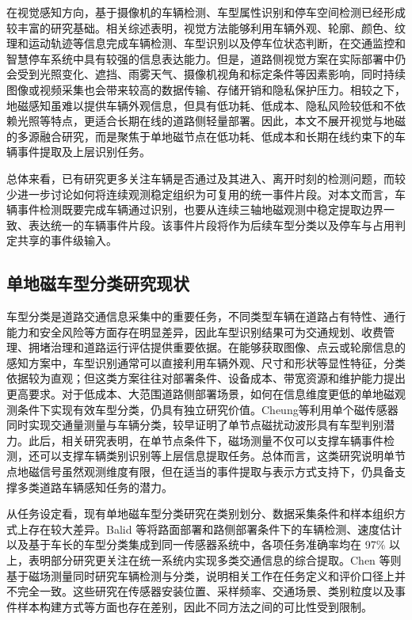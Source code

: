 \documentclass{xdupgthesis}
\begin{document}
在视觉感知方向，基于摄像机的车辆检测、车型属性识别和停车空间检测已经形成较丰富的研究基础。相关综述表明，视觉方法能够利用车辆外观、轮廓、颜色、纹理和运动轨迹等信息完成车辆检测、车型识别以及停车位状态判断，在交通监控和智慧停车系统中具有较强的信息表达能力\cite{ch1_yang2018visionvehicle,ch1_ni2021vehicleattribute,ch1_ma2022visionparking}。但是，道路侧视觉方案在实际部署中仍会受到光照变化、遮挡、雨雾天气、摄像机视角和标定条件等因素影响，同时持续图像或视频采集也会带来较高的数据传输、存储开销和隐私保护压力。相较之下，地磁感知虽难以提供车辆外观信息，但具有低功耗、低成本、隐私风险较低和不依赖光照等特点，更适合长期在线的道路侧轻量部署。因此，本文不展开视觉与地磁的多源融合研究，而是聚焦于单地磁节点在低功耗、低成本和长期在线约束下的车辆事件提取及上层识别任务。

总体来看，已有研究更多关注车辆是否通过及其进入、离开时刻的检测问题，而较少进一步讨论如何将连续观测稳定组织为可复用的统一事件片段。对本文而言，车辆事件检测既要完成车辆通过识别，也要从连续三轴地磁观测中稳定提取边界一致、表达统一的车辆事件片段。该事件片段将作为后续车型分类以及停车与占用判定共享的事件级输入。

\subsection{单地磁车型分类研究现状}
\label{sec:related_vehicle_classification}

车型分类是道路交通信息采集中的重要任务，不同类型车辆在道路占有特性、通行能力和安全风险等方面存在明显差异，因此车型识别结果可为交通规划、收费管理、拥堵治理和道路运行评估提供重要依据。在能够获取图像、点云或轮廓信息的感知方案中，车型识别通常可以直接利用车辆外观、尺寸和形状等显性特征，分类依据较为直观；但这类方案往往对部署条件、设备成本、带宽资源和维护能力提出更高要求。对于低成本、大范围道路侧部署场景，如何在信息维度更低的单地磁观测条件下实现有效车型分类，仍具有独立研究价值。Cheung等\cite{R17}利用单个磁传感器同时实现交通量测量与车辆分类，较早证明了单节点磁扰动波形具有车型判别潜力。此后，相关研究表明，在单节点条件下，磁场测量不仅可以支撑车辆事件检测，还可以支撑车辆类别识别等上层信息提取任务\cite{R19}。总体而言，这类研究说明单节点地磁信号虽然观测维度有限，但在适当的事件提取与表示方式支持下，仍具备支撑多类道路车辆感知任务的潜力。

从任务设定看，现有单地磁车型分类研究在类别划分、数据采集条件和样本组织方式上存在较大差异。Balid 等\cite{R18}将路面部署和路侧部署条件下的车辆检测、速度估计以及基于车长的车型分类集成到同一传感器系统中，各项任务准确率均在 97\% 以上，表明部分研究更关注在统一系统内实现多类交通信息的综合提取。Chen 等\cite{R19}则基于磁场测量同时研究车辆检测与分类，说明相关工作在任务定义和评价口径上并不完全一致。这些研究在传感器安装位置、采样频率、交通场景、类别粒度以及事件样本构建方式等方面也存在差别，因此不同方法之间的可比性受到限制。
\end{document}
